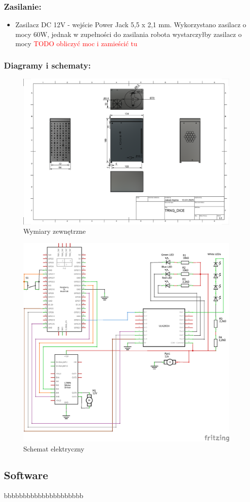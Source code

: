 \subsubsection{Zasilanie:}
\begin{itemize}
    \item Zasilacz DC 12V - wejście Power Jack 5,5 x 2,1 mm. Wykorzystano zasilacz o mocy 60W, jednak w zupełności do zasilania robota wystarczyłby zasilacz o mocy \textcolor{red}{TODO obliczyć moc i zamieścić tu}
\end{itemize}


\subsubsection{Diagramy i schematy:}

\begin{figure}[H]
    \centering
    \includegraphics[width=0.95\linewidth]{chapters/03-praca-wlasna/figures/wymiary.png}
    \caption{\label{fig:wymiary}Wymiary zewnętrzne}
\end{figure}

\begin{figure}[H]
    \centering
    \includegraphics[width=0.95\linewidth]{chapters/03-praca-wlasna/figures/electronics circut_schem.png}
    \caption{\label{fig:electronics}Schemat elektryczny}
\end{figure}

\subsection{Software}
bbbbbbbbbbbbbbbbbbbbb